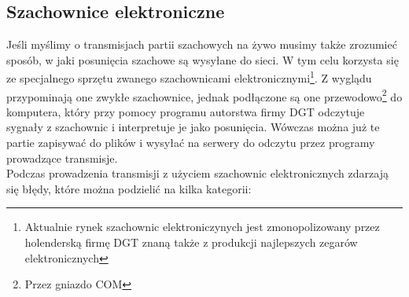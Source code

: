 \documentclass[12pt,leqno]{article}
\begin{document}
\subsection{Szachownice elektroniczne}
Jeśli myślimy o transmisjach partii szachowych na żywo musimy także zrozumieć sposób, w jaki posunięcia szachowe są wysyłane do sieci. W tym celu korzysta się ze specjalnego sprzętu zwanego szachownicami elektronicznymi\footnote{Aktualnie rynek szachownic elektroniczynych jest zmonopolizowany przez holenderską firmę DGT znaną także z produkcji najlepszych zegarów elektronicznych}. Z wyglądu przypominają one zwykłe szachownice, jednak podłączone są one przewodowo\footnote{Przez gniazdo COM} do komputera, który przy pomocy programu autorstwa firmy DGT odczytuje sygnały z szachownic i interpretuje je jako posunięcia. Wówczas można już te partie zapisywać do plików i wysyłać na serwery do odczytu przez programy prowadzące transmisje. \\
Podczas prowadzenia transmisji z użyciem szachownic elektronicznych zdarzają się błędy, które można podzielić na kilka kategorii:
\end{document}
